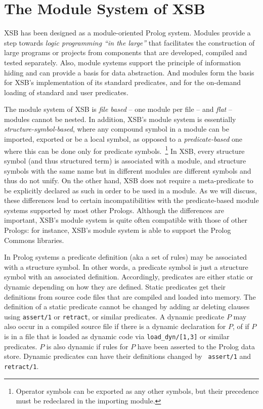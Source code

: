 
\section{The Module System of XSB} \label{Modules}

XSB has been designed as a module-oriented Prolog system.  Modules
provide a step towards {\em logic programming ``in the large''} that
facilitates the construction of large programs or projects from
components that are developed, compiled and tested separately.  Also,
module systems support the principle of information hiding and can
provide a basis for data abstraction.  And modules form the basis for
XSB's implementation of its standard predicates, and for the on-demand
loading of standard and user predicates.

The module system of XSB is {\em file based} -- one module per file --
and {\em flat} -- modules cannot be nested.  In addition, XSB's module
system is essentially {\em structure-symbol-based}, where any compound
symbol in a module can be imported, exported or be a local symbol, as
opposed to a {\em predicate-based} one where this can be done only for
predicate symbols.~\footnote{Operator symbols can be exported as any
  other symbols, but their precedence must be redeclared in the
  importing module.}  In XSB, every structure symbol (and thus
structured term) is associated with a module, and structure symbols
with the same name but in different modules are different symbols and
thus do not unify.  On the other hand, XSB does not require a
meta-predicate to be explicitly declared as such in order to be used
in a module.  As we will discuss, these differences lead to certain
incompatibilities with the predicate-based module systems supported by
most other Prologs.  Although the differences are important, XSB's
module system is quite often compatible with those of other Prologs:
for instance, XSB's module system is able to support the Prolog
Commons libraries.

In Prolog systems a predicate definition (aka a set of rules) may be
associated with a structure symbol.  In other words, a predicate
symbol is just a structure symbol with an associated definition.
Accordingly, predicates are either static or dynamic depending on how
they are defined.  Static predicates get their definitions from source
code files that are compiled and loaded into memory.
The definition of a static predicate cannot be changed by adding ar
deleting clauses using {\tt assert/1} or {\tt retract}, or similar
predicates.
A dynamic
predicate $P$ may also occur in a compiled source file if there is a
dynamic declaration for $P$, of if $P$ is in a file that is loaded as
dynamic code via {\tt load\_dyn/[1,3]} or similar predicates.  $P$ is
also dynamic if rules for $P$ have been asserted to the Prolog data
store.  Dynamic predicates can have their definitions changed by {\tt
  assert/1} and {\tt retract/1}.

